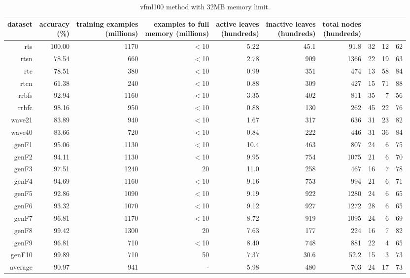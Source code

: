 \clearpage
\begin{table}
\caption{{\sc vfml100} method with 32MB memory limit.}
\label{tab:vfml100-32MB}
\centering
\begin{tabular}{|r|r|r|r|r|r|r|r|r|r|}
\hline
dataset	&
\rotatebox{90}{\parbox{9em}{accuracy\\(\%)}} &
\rotatebox{90}{\parbox{9em}{training examples\\(millions)}} &
\rotatebox{90}{\parbox{9em}{examples to full\\memory (millions)}} &
\rotatebox{90}{\parbox{9em}{active leaves\\(hundreds)}} &
\rotatebox{90}{\parbox{9em}{inactive leaves\\(hundreds)}} &
\rotatebox{90}{\parbox{9em}{total nodes\\(hundreds)}} &
\rotatebox{90}{\parbox{9em}{tree depth}}	&
\rotatebox{90}{\parbox{9em}{training speed (\%)}} &
\rotatebox{90}{\parbox{9em}{prediction speed (\%)}} \\
\hline
{\sc rts} & 100.00 & 1170 & $<$10 & 5.22 & 45.1 & 91.8 & 32 & 12 & 62 \\
{\sc rtsn} & 78.54 & 660 & $<$10 & 2.78 & 909 & 1366 & 22 & 19 & 63 \\
{\sc rtc} & 78.51 & 380 & $<$10 & 0.99 & 351 & 474 & 13 & 58 & 84 \\
{\sc rtcn} & 61.38 & 240 & $<$10 & 0.88 & 309 & 427 & 15 & 71 & 88 \\
{\sc rrbfs} & 92.94 & 1160 & $<$10 & 3.35 & 402 & 811 & 35 & 7 & 56 \\
{\sc rrbfc} & 98.16 & 950 & $<$10 & 0.88 & 130 & 262 & 45 & 22 & 76 \\
{\sc wave21} & 83.89 & 940 & $<$10 & 1.67 & 317 & 636 & 31 & 23 & 82 \\
{\sc wave40} & 83.66 & 720 & $<$10 & 0.84 & 222 & 446 & 31 & 36 & 84 \\
{\sc genF1} & 95.06 & 1130 & $<$10 & 10.4 & 463 & 807 & 24 & 6 & 75 \\
{\sc genF2} & 94.11 & 1130 & $<$10 & 9.95 & 754 & 1075 & 21 & 6 & 70 \\
{\sc genF3} & 97.51 & 1240 & 20 & 11.0 & 258 & 467 & 16 & 7 & 78 \\
{\sc genF4} & 94.69 & 1160 & $<$10 & 9.16 & 753 & 994 & 21 & 6 & 71 \\
{\sc genF5} & 92.86 & 1090 & $<$10 & 9.19 & 922 & 1280 & 24 & 6 & 65 \\
{\sc genF6} & 93.32 & 1070 & $<$10 & 9.12 & 927 & 1272 & 28 & 6 & 65 \\
{\sc genF7} & 96.81 & 1170 & $<$10 & 8.72 & 919 & 1095 & 24 & 6 & 69 \\
{\sc genF8} & 99.42 & 1300 & 20 & 7.63 & 177 & 224 & 16 & 7 & 82 \\
{\sc genF9} & 96.81 & 710 & $<$10 & 8.40 & 748 & 881 & 22 & 4 & 65 \\
{\sc genF10} & 99.89 & 710 & 50 & 7.37 & 30.6 & 52.2 & 15 & 3 & 73 \\
\hline
average & 90.97 & 941 &  -  & 5.98 & 480 & 703 & 24 & 17 & 73 \\
\hline
\end{tabular}
\end{table}
